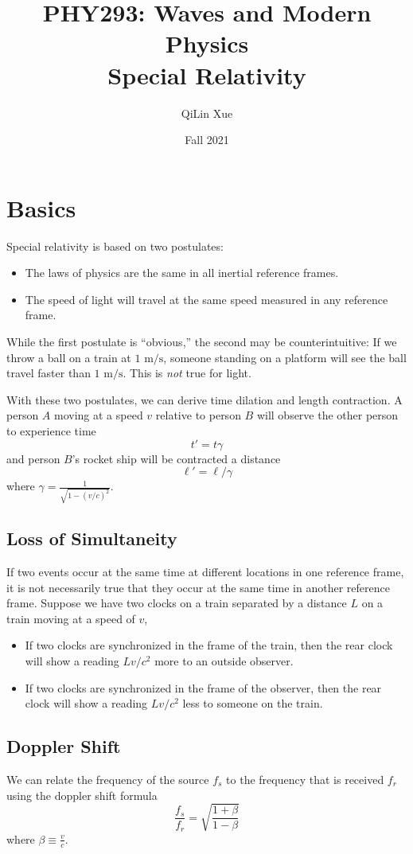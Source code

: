 \documentclass{article}
\title{PHY293: Waves and Modern Physics \\ \textbf{Special Relativity}}
\author{QiLin Xue}
\date{Fall 2021}
\begin{document}
\maketitle
\section{Basics}
Special relativity is based on two postulates:
\begin{itemize}
    \item The laws of physics are the same in all inertial reference frames.
    \item The speed of light will travel at the same speed measured in any reference frame.
\end{itemize}
While the first postulate is ``obvious,'' the second may be counterintuitive: If we throw a ball on a train at $1\text{ m/s}$, someone standing on a platform will see the ball travel faster than $1\text{ m/s}$. This is \textit{not} true for light.

With these two postulates, we can derive time dilation and length contraction. A person $A$ moving at a speed $v$ relative to person $B$ will observe the other person to experience time
\begin{equation}
    t' = t\gamma
\end{equation}
and person $B$'s rocket ship will be contracted a distance
\begin{equation}
    \ell' = \ell/\gamma
\end{equation}
where $\gamma = \frac{1}{\sqrt{1-(v/c)^2}}$.
\subsection{Loss of Simultaneity}
If two events occur at the same time at different locations in one reference frame, it is not necessarily true that they occur at the same time in another reference frame. Suppose we have two clocks on a train separated by a distance $L$ on a train moving at a speed of $v$,
\begin{itemize}
    \item If two clocks are synchronized in the frame of the train, then the rear clock will show a reading $Lv/c^2$ more to an outside observer.
    \item If two clocks are synchronized in the frame of the observer, then the rear clock will show a reading $Lv/c^2$ less to someone on the train.
\end{itemize}
\subsection{Doppler Shift}
We can relate the frequency of the source $f_s$ to the frequency that is received $f_r$ using the doppler shift formula 
\begin{equation}
    \frac{f_s}{f_r} = \sqrt{\frac{1+\beta}{1-\beta}}
\end{equation}
where $\beta \equiv \frac{v}{c}.$
\end{document}
